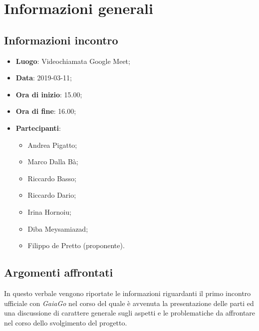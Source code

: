\section{Informazioni generali}

\subsection{Informazioni incontro}
\begin{itemize}
\item \textbf{Luogo}: Videochiamata Google Meet;
\item \textbf{Data}: 2019-03-11;
\item \textbf{Ora di inizio}: 15.00;
\item \textbf{Ora di fine}: 16.00;
\item \textbf{Partecipanti}: 
\begin{itemize}
	\item Andrea Pigatto;
	\item Marco Dalla Bà;
	\item Riccardo Basso;
	\item Riccardo Dario;
	\item Irina Hornoiu;
	\item Diba Meysamiazad;
	\item Filippo de Pretto (proponente).
\end{itemize}
\end{itemize}

\subsection{Argomenti affrontati}
In questo verbale vengono riportate le informazioni riguardanti il primo incontro ufficiale con \textit{GaiaGo} nel corso del quale è avvenuta la presentazione delle parti ed una discussione di carattere generale sugli aspetti e le problematiche da affrontare nel corso dello svolgimento del progetto.
